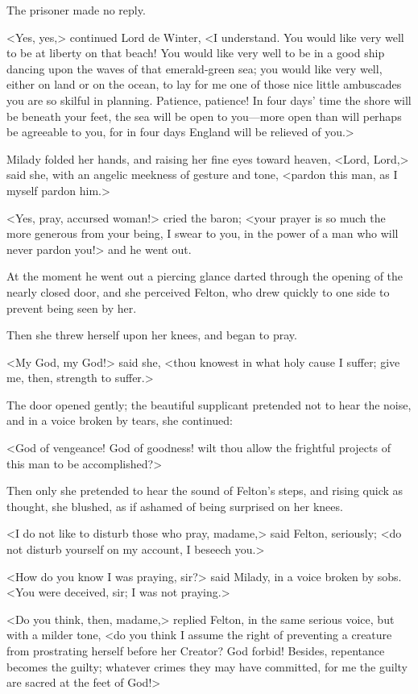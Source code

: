 The prisoner made no reply. 

<Yes, yes,> continued Lord de Winter, <I understand. You would like very well to be at liberty on that beach! You would like very well to be in a good ship dancing upon the waves of that emerald-green sea; you would like very well, either on land or on the ocean, to lay for me one of those nice little ambuscades you are so skilful in planning. Patience, patience! In four days' time the shore will be beneath your feet, the sea will be open to you—more open than will perhaps be agreeable to you, for in four days England will be relieved of you.> 

Milady folded her hands, and raising her fine eyes toward heaven, <Lord, Lord,> said she, with an angelic meekness of gesture and tone, <pardon this man, as I myself pardon him.> 

<Yes, pray, accursed woman!> cried the baron; <your prayer is so much the more generous from your being, I swear to you, in the power of a man who will never pardon you!> and he went out. 

At the moment he went out a piercing glance darted through the opening of the nearly closed door, and she perceived Felton, who drew quickly to one side to prevent being seen by her. 

Then she threw herself upon her knees, and began to pray. 

<My God, my God!> said she, <thou knowest in what holy cause I suffer; give me, then, strength to suffer.> 

The door opened gently; the beautiful supplicant pretended not to hear the noise, and in a voice broken by tears, she continued: 

<God of vengeance! God of goodness! wilt thou allow the frightful projects of this man to be accomplished?> 

Then only she pretended to hear the sound of Felton's steps, and rising quick as thought, she blushed, as if ashamed of being surprised on her knees. 

<I do not like to disturb those who pray, madame,> said Felton, seriously; <do not disturb yourself on my account, I beseech you.> 

<How do you know I was praying, sir?> said Milady, in a voice broken by sobs. <You were deceived, sir; I was not praying.> 

<Do you think, then, madame,> replied Felton, in the same serious voice, but with a milder tone, <do you think I assume the right of preventing a creature from prostrating herself before her Creator? God forbid! Besides, repentance becomes the guilty; whatever crimes they may have committed, for me the guilty are sacred at the feet of God!> 


